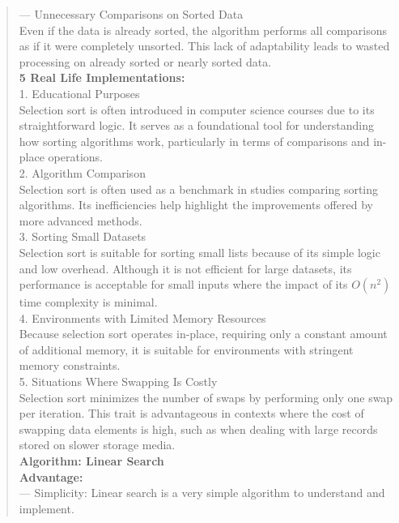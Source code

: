 \begin{quote}
    --- Unnecessary Comparisons on Sorted Data \\
    Even if the data is already sorted, the algorithm performs all comparisons as if it were completely unsorted. This lack of adaptability leads to wasted processing on already sorted or nearly sorted data. \\
    
    \textbf{5 Real Life Implementations:} \\
    1. Educational Purposes \\
    Selection sort is often introduced in computer science courses due to its straightforward logic. It serves as a foundational tool for understanding how sorting algorithms work, particularly in terms of comparisons and in-place operations. \\
    
    2. Algorithm Comparison \\
    Selection sort is often used as a benchmark in studies comparing sorting algorithms. Its inefficiencies help highlight the improvements offered by more advanced methods. \\
    
    3. Sorting Small Datasets \\
    Selection sort is suitable for sorting small lists because of its simple logic and low overhead. Although it is not efficient for large datasets, its performance is acceptable for small inputs where the impact of its \(O(n^2)\) time complexity is minimal. \\
    
    4. Environments with Limited Memory Resources \\
    Because selection sort operates in-place, requiring only a constant amount of additional memory, it is suitable for environments with stringent memory constraints. \\
    
    5. Situations Where Swapping Is Costly \\
    Selection sort minimizes the number of swaps by performing only one swap per iteration. This trait is advantageous in contexts where the cost of swapping data elements is high, such as when dealing with large records stored on slower storage media. \\
    
    \vspace{10pt}
    \textbf{Algorithm: Linear Search} \\
    
    \textbf{Advantage:} \\
    --- Simplicity: Linear search is a very simple algorithm to understand and implement. \\
    

\end{quote}
